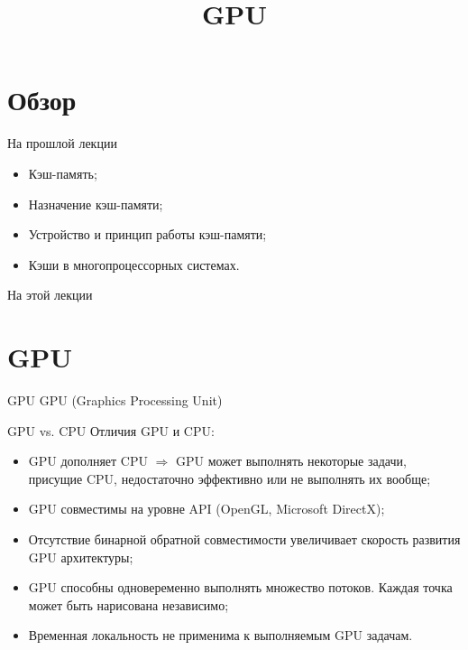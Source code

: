 

\title{GPU}



\begin{frame}
\titlepage
\end{frame}

\section*{Обзор}

\begin{frame}{На прошлой лекции}
\begin{itemize}
\ifsbertech
    \item Кэш-память;
    \item Назначение кэш-памяти;
    \item Устройство и принцип работы кэш-памяти;
    \item Кэши в многопроцессорных системах.
\fi
\end{itemize}
\end{frame}

\begin{frame}{На этой лекции}
\tableofcontents
\end{frame}

\section{GPU}

\begin{frame}{GPU}
GPU (\abbr Graphics Processing Unit)
\end{frame}

\begin{frame}{GPU vs. CPU}
Отличия GPU и CPU:
\begin{itemize}
    \item GPU дополняет CPU $\Rightarrow$ GPU может выполнять некоторые задачи,
    присущие CPU, недостаточно эффективно или не выполнять их вообще;
    \item GPU совместимы на уровне API (OpenGL, Microsoft DirectX);
    \item Отсутствие бинарной обратной совместимости увеличивает скорость
    развития GPU архитектуры;
    \item GPU способны одновеременно выполнять множество потоков. Каждая точка
    может быть нарисована независимо;
    \item Временная локальность не применима к выполняемым GPU задачам.
\end{itemize}
\end{frame}

